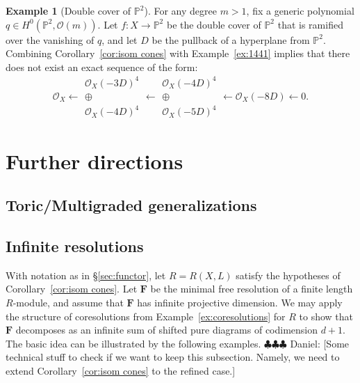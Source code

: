 \documentclass[12pt]{amsart}
\theoremstyle{definition}
\newtheorem{example}[lemma]{Example}
\theoremstyle{remark}
\newcommand{\PP}{\mathbb{P}}
\newcommand{\cO}{\mathcal{O}}
\newcommand{\FF}{\mathbf{F}}
\newcommand{\daniel}[1]{{\color{green} \sf $\clubsuit\clubsuit\clubsuit$ Daniel: [#1]}}
\begin{document}
\begin{example}[Double cover of $\PP^2$]
For any degree $m>1$, fix a generic polynomial $q\in H^0(\PP^2, \cO(m))$.  Let $f\colon X\to\PP^2$ be the double cover of $\PP^2$ that is ramified over the vanishing of $q$, and let $D$ be the pullback of a hyperplane from $\PP^2$.  Combining Corollary~\ref{cor:isom cones} with Example~\ref{ex:1441} implies that there does not exist an exact sequence of the form:
\[
\cO_X\longleftarrow \begin{matrix}  \cO_X(-3D)^4\\ \oplus\\ \cO_X(-4D)^4\end{matrix}\longleftarrow \begin{matrix}  \cO_X(-4D)^4\\ \oplus\\ \cO_X(-5D)^4\end{matrix} \longleftarrow \cO_X(-8D)\longleftarrow 0.
\]
\end{example}


\section{Further directions}\label{sec:further}




\subsection{Toric/Multigraded generalizations}\label{subsec:toric}


\subsection{Infinite resolutions}\label{subsec:infinite}
With notation as in \S\ref{sec:functor}, let $R=R(X,L)$ satisfy the hypotheses of Corollary~\ref{cor:isom cones}.  Let $\FF$ be the minimal free resolution of a finite length $R$-module, and assume that $\FF$ has infinite projective dimension.  We may apply the structure of coresolutions from Example~\ref{ex:coresolutions} for $R$ to show that $\FF$ decomposes as an infinite sum of shifted pure diagrams of codimension $d+1$.  The basic idea can be illustrated by the following examples.\daniel{Some technical stuff to check if we want to keep this subsection.  Namely, we need to extend Corollary~\ref{cor:isom cones} to the refined case.}
\end{document}
